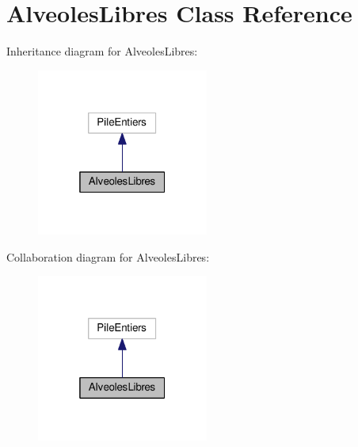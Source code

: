 \hypertarget{classAlveolesLibres}{}\section{Alveoles\+Libres Class Reference}
\label{classAlveolesLibres}


Inheritance diagram for Alveoles\+Libres\+:
\nopagebreak
\begin{figure}[H]
\begin{center}
\leavevmode
\includegraphics[width=160pt]{classAlveolesLibres__inherit__graph}
\end{center}
\end{figure}


Collaboration diagram for Alveoles\+Libres\+:
\nopagebreak
\begin{figure}[H]
\begin{center}
\leavevmode
\includegraphics[width=160pt]{classAlveolesLibres__coll__graph}
\end{center}
\end{figure}
